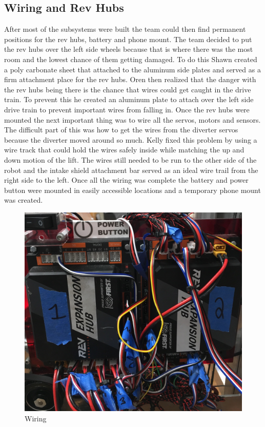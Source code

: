 \documentclass{article}
\begin{document}
\subsection{Wiring and Rev Hubs}
After most of the subsystems were built the team could then find permanent positions for the rev hubs, battery and phone mount. The team decided to put the rev hubs over the left side wheels because that is where there was the most room and the lowest chance of them getting damaged. To do this Shawn created a poly carbonate sheet that attached to the aluminum side plates and served as a firm attachment place for the rev hubs. Oren then realized that the danger with the rev hubs being there is the chance that wires could get caught in the drive train. To prevent this he created an aluminum plate to attach over the left side drive train to prevent important wires from falling in. Once the rev hubs were mounted the next important thing was to wire all the servos, motors and sensors. The difficult part of this was how to get the wires from the diverter servos because the diverter moved around so much. Kelly fixed this problem by using a wire track that could hold the wires safely inside while matching the up and down motion of the lift. The wires still needed to be run to the other side of the robot and the intake shield attachment bar served as an ideal wire trail from the right side to the left. Once all the wiring was complete the battery and power button were mounted in easily accessible locations and a temporary phone mount was created.

\begin{figure}
    \centering
    \includegraphics[width=.6 \textwidth]{20_01-14/images/wiring.jpg}
    \caption{Wiring}
    \label{fig:wiring}
\end{figure}
\end{document}
